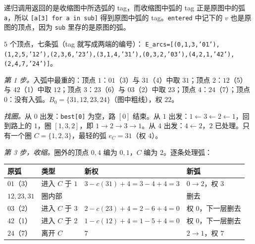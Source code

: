 递归调用返回的是收缩图中所选弧的 tag，而收缩图中弧的 tag 正是原图中的弧 \texttt{a}，所以 \texttt{[a[3] for a in sub]} 得到原图中弧的 tag。\texttt{entered} 中记下的 $v$ 也是原图的顶点，因为 \texttt{sub} 里存的是原图的弧。

\begin{example}\label{ex:branchings:run}
$5$ 个顶点，七条弧（tag 就写成两端的编号）：
\texttt{E\_arcs=[(0,1,3,'01'),(1,2,5,'12'),(2,3,6,'23'),(3,1,4,'31'),(0,3,2,'03'),(4,2,1,'42'),(2,4,7,'24')]}。
\begin{center}
\end{center}
\emph{第 1 步。}入弧中最重的：顶点 $1$：$01$（3）与 $31$（4）中取 $31$；顶点 $2$：$12$（5）与 $42$（1）中取 $12$；顶点 $3$：$23$（6）与 $03$（2）中取 $23$；顶点 $4$：$24$（7）；顶点 $0$：没有入弧。$B_0=\{31,12,23,24\}$（图中粗线），权 $22$。

\emph{找圈。}从 $0$ 出发：\texttt{best[0]} 为空，路 $[0]$ 结束。从 $1$ 出发：$1\leftarrow3\leftarrow2\leftarrow1$，回到路上的 $1$，圈 $[1,3,2]$，即 $1\to2\to3\to1$。从 $4$ 出发：$4\leftarrow2$，$2$ 已处理。只有一个圈 $C=\{1,2,3\}$，最轻的弧 $e_C=31$（权 $4$）。

\emph{第 3 步，收缩。}圈外的顶点 $0,4$ 编为 $0,1$，$C$ 编为 $2$。逐条处理弧：
\begin{center}
\small
\begin{tabular}{llll}
\toprule
原弧 & 类型 & 新权 & 新弧 \\
\midrule
$01$（3） & 进入 $C$ 于 $1$ & $3-c(31)+4=3-4+4=3$ & $0\to2$，权 $3$ \\
$12,23,31$ & 圈内部 & & 删去 \\
$03$（2） & 进入 $C$ 于 $3$ & $2-c(23)+4=2-6+4=0$ & 权 $0$，下一层删去 \\
$42$（1） & 进入 $C$ 于 $2$ & $1-c(12)+4=1-5+4=0$ & 权 $0$，下一层删去 \\
$24$（7） & 离开 $C$ & $7$ & $2\to1$，权 $7$ \\
\bottomrule
\end{tabular}
\end{center}


\end{example}
